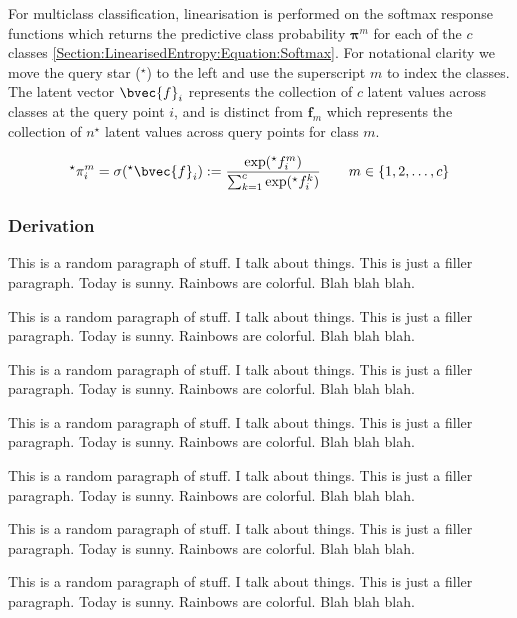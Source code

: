 \documentclass{article}
\renewcommand{\vec}[1]{\boldsymbol{#1}}
\begin{document}
		For multiclass classification, linearisation is performed on the softmax response functions which returns the predictive class probability $\vec{\pi}^{m}$ for each of the $c$ classes \eqref{Section:LinearisedEntropy:Equation:Softmax}. For notational clarity we move the query star ($^\star$) to the left and use the superscript $m$ to index the classes. The latent vector $\bvec{f}_{i}$ represents the collection of $c$ latent values across classes at the query point $i$, and is distinct from $\vec{f}_{m}$ which represents the collection of $n^{\star}$ latent values across query points for class $m$.

		\begin{equation}
			^{\star}\pi^{m}_{i} = \sigma(^{\star}\bvec{f}_{i}) := \frac{\exp(^{\star}f^{m}_{i})}{\sum_{k = 1}^{c} \exp(^{\star}f^{k}_{i})} \qquad m \in \{1, 2, \dots, c\}
		\label{Section:LinearisedEntropy:Equation:Softmax}
		\end{equation}	
					
		\subsubsection{Derivation}
		
		{\color{BurntOrange} This is a random paragraph of stuff. I talk about things. This is just a filler paragraph. Today is sunny. Rainbows are colorful. Blah blah blah.}
		
		{\color{BurntOrange} This is a random paragraph of stuff. I talk about things. This is just a filler paragraph. Today is sunny. Rainbows are colorful. Blah blah blah.}
		
		{\color{BurntOrange} This is a random paragraph of stuff. I talk about things. This is just a filler paragraph. Today is sunny. Rainbows are colorful. Blah blah blah.}
		
		{\color{BurntOrange} This is a random paragraph of stuff. I talk about things. This is just a filler paragraph. Today is sunny. Rainbows are colorful. Blah blah blah.}
		
		{\color{BurntOrange} This is a random paragraph of stuff. I talk about things. This is just a filler paragraph. Today is sunny. Rainbows are colorful. Blah blah blah.}
		
		{\color{BurntOrange} This is a random paragraph of stuff. I talk about things. This is just a filler paragraph. Today is sunny. Rainbows are colorful. Blah blah blah.}
		
		{\color{BurntOrange} This is a random paragraph of stuff. I talk about things. This is just a filler paragraph. Today is sunny. Rainbows are colorful. Blah blah blah.}
		
\end{document}
